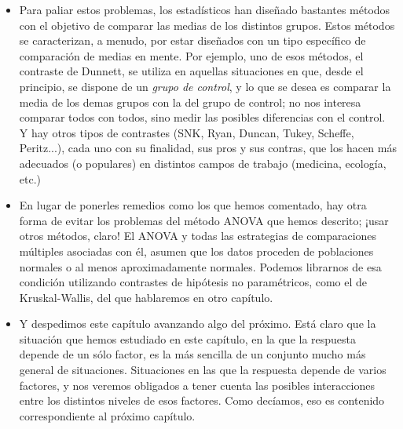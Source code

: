 \begin{itemize}
        \item Para paliar estos problemas, los estadísticos han diseñado bastantes métodos con el objetivo de comparar las medias de los distintos grupos. Estos métodos se caracterizan, a menudo, por estar diseñados con un tipo específico de comparación de medias en mente. Por ejemplo, uno de esos métodos, el contraste de Dunnett, se utiliza en aquellas situaciones en que, desde el principio, se dispone de un {\em grupo de control}, y lo que se desea es comparar la media de los demas grupos con la del grupo de control; no nos interesa comparar todos con todos, sino medir las posibles diferencias con el control. Y hay otros tipos de contrastes (SNK, Ryan, Duncan, Tukey, Scheffe, Peritz...), cada uno con su finalidad, sus pros y sus contras, que los hacen más adecuados (o populares) en distintos campos de trabajo (medicina, ecología, etc.)

        \item En lugar de ponerles remedios como los que hemos comentado, hay otra forma de evitar los problemas del método ANOVA que hemos descrito; ¡usar otros métodos, claro! El ANOVA y todas las estrategias de comparaciones múltiples asociadas con él, asumen que los datos proceden de poblaciones normales o al menos aproximadamente normales. Podemos librarnos de esa condición utilizando contrastes de hipótesis no paramétricos, como el de Kruskal-Wallis, del que hablaremos en otro capítulo.

        \item Y despedimos este capítulo avanzando algo del próximo. Está claro que la situación que hemos estudiado en este capítulo, en la que la respuesta depende de un sólo factor, es la más sencilla de un conjunto mucho más general de situaciones. Situaciones en las que la respuesta depende de varios factores, y nos veremos obligados a tener cuenta las posibles interacciones entre los distintos niveles de esos factores. Como decíamos, eso es contenido correspondiente al próximo capítulo.
    \end{itemize}


%
%

